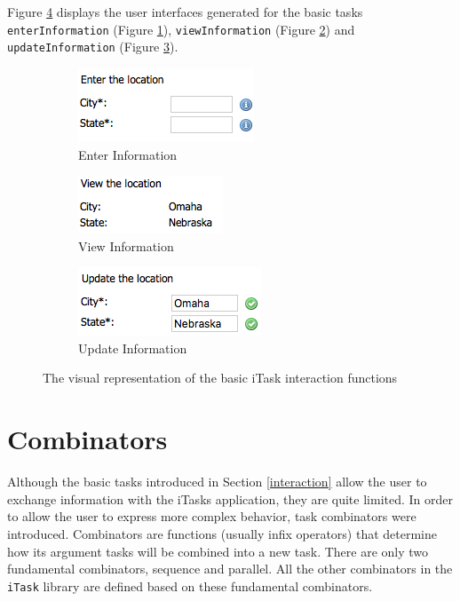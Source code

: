 Figure \ref{fig:itasks_display} displays the user interfaces generated for the basic tasks \texttt{enterInformation} (Figure \ref{fig:enter_info}), \texttt{viewInformation} (Figure \ref{fig:view_info}) and \texttt{updateInformation} (Figure \ref{fig:upd_info}).

\begin{figure}[H]
\begin{subfigure}{0.33\textwidth}
\includegraphics[scale=0.7]{thesis/img/enter_location.png}
\caption{Enter Information}
\label{fig:enter_info}
\end{subfigure}
\begin{subfigure}{0.33\textwidth}
\includegraphics[scale=0.55]{thesis/img/view_location.png}
\caption{View Information}
\label{fig:view_info}
\end{subfigure}
\begin{subfigure}{0.33\textwidth}
\includegraphics[scale=0.7]{thesis/img/update_location.png}
\caption{Update Information}
\label{fig:upd_info}
\end{subfigure}
\caption{The visual representation of the basic iTask interaction functions}
\label{fig:itasks_display}
\end{figure}


\section{Combinators}\label{combinators}

Although the basic tasks introduced in Section \ref{interaction} allow the user to exchange information with the iTasks application, they are quite limited. In order to allow the user to express more complex behavior, task combinators were introduced. Combinators are functions (usually infix operators) that determine how its argument tasks will be combined into a new task. There are only two fundamental combinators, sequence and parallel. All the other combinators in the \texttt{iTask} library are defined based on these fundamental combinators.

